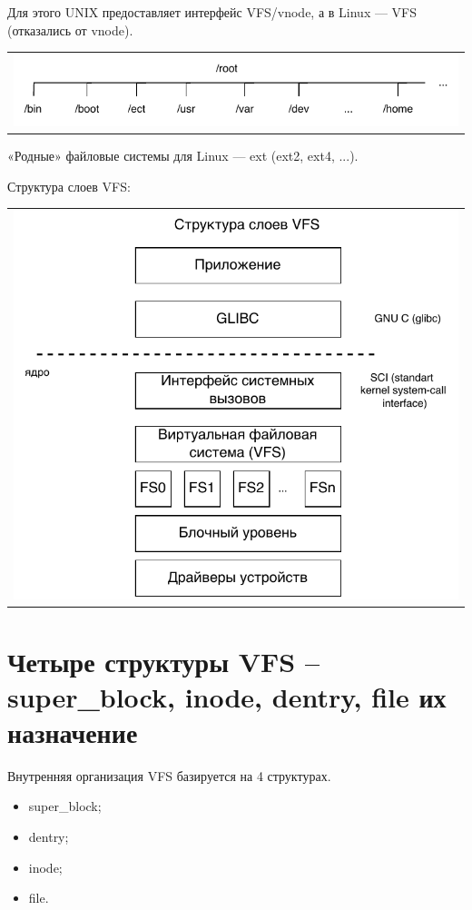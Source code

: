 Для этого UNIX предоставляет интерфейс VFS/vnode, а в Linux — VFS (отказались от vnode).

\begin{table}[h!]
  \centering
  \begin{tabular}{p{1\linewidth}}
    \centering
    \includegraphics[width=0.8\linewidth]{./images/root.pdf}
  \end{tabular}
\end{table}

«Родные» файловые системы для Linux — ext (ext2, ext4, ...).

Структура слоев VFS:

\begin{table}[h!]
  \centering
  \begin{tabular}{p{1\linewidth}}
    \centering
    \includegraphics[width=0.8\linewidth]{./images/VFS_struct.pdf}
  \end{tabular}
\end{table}

\section{Четыре структуры VFS – super\_block, inode, dentry, file их назначение}

Внутренняя организация VFS базируется на 4 структурах.

\begin{itemize}
    \item super\_block;
    \item dentry;
    \item inode;
    \item file.
\end{itemize}

